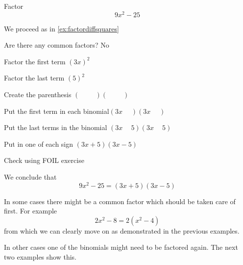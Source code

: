 \begin{myexample}
Factor
\[
	9x^2-25
\]
{}
\end{myexample}
\begin{myProof}
	We proceed as in \cref{ex:factordiffsquares}
	\begin{steps}
		\item	Are there any common factors?      \hfill  No                             
		\item	Factor the first term              \hfill  $(3x)^2$
		\item	Factor the last term               \hfill  $(5)^2$
		\item	Create the parenthesis             \hfill  $(\phantom{x+4})(\phantom{x-4}) $  
		\item	Put the first term in each binomial\hfill  $(3x\phantom{+4})(3x\phantom{-4})$ 
		\item	Put the last terms in the binomial \hfill  $(3x\phantom{+}5)(3x\phantom{-}5)$ 
		\item	Put in one of each sign            \hfill  $(3x+5)(3x-5)                    $ 
		\item	Check using FOIL                   \hfill  exercise                       
	\end{steps}
	We conclude that
	\[
		9x^2-25 = (3x+5)(3x-5)
	\]
	{}
\end{myProof} 

In some cases there might be a common factor which should be taken care of first. For example
\[
	2x^2-8 = 2(x^2-4)
\]
from which we can clearly move on as demonstrated in the previous examples. 

In other cases one of the binomials might need to be factored again. The next two examples 
show this.

